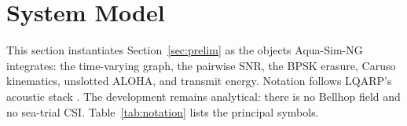 \documentclass[journal]{IEEEtran}
\begin{document}
\begin{table}[!t]
\caption{Position Relative to Closely Related Protocols}
\label{tab:vs}
\centering
\setlength{\tabcolsep}{2.4pt}
\end{table}

\section{System Model}
\label{sec:model}

This section instantiates Section~\ref{sec:prelim} as the objects
Aqua-Sim-NG integrates: the time-varying graph, the pairwise SNR,
the BPSK erasure, Caruso kinematics, unslotted ALOHA, and transmit
energy.
Notation follows LQARP's acoustic stack \cite{liu2026lqarp}.
The development remains analytical: there is no Bellhop field and no
sea-trial CSI. Table~\ref{tab:notation} lists the principal symbols.
\end{document}
